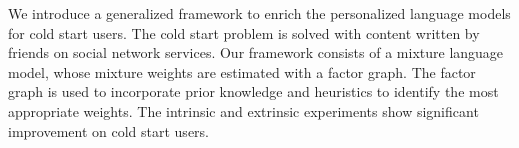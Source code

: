 We introduce a generalized framework to enrich the personalized language models for cold start users. The cold start problem is solved with content written by friends on social network services. Our framework consists of a mixture language model, whose mixture weights are estimated with a factor graph. The factor graph is used to incorporate prior knowledge and heuristics to identify the most appropriate weights. The intrinsic and extrinsic experiments show significant improvement on cold start users.
